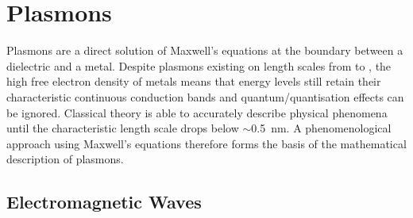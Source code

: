 \documentclass{article}
\begin{document}
\section{Plasmons}
\label{sec:plasmons}

Plasmons are a direct solution of Maxwell's equations at the boundary between a dielectric and a metal. Despite plasmons existing on length scales from  to , the high free electron density of metals means that energy levels still retain their characteristic continuous conduction bands and {\color{red}quantum/quantisation} effects can be ignored. Classical theory is able to accurately describe physical phenomena until the characteristic length scale drops below $\sim$\SI{0.5}{nm}. A phenomenological approach using Maxwell's equations \cite{maxwell1865} therefore forms the basis of the mathematical description of plasmons.

\subsection{Electromagnetic Waves}
\label{sec:em_waves}
\end{document}
